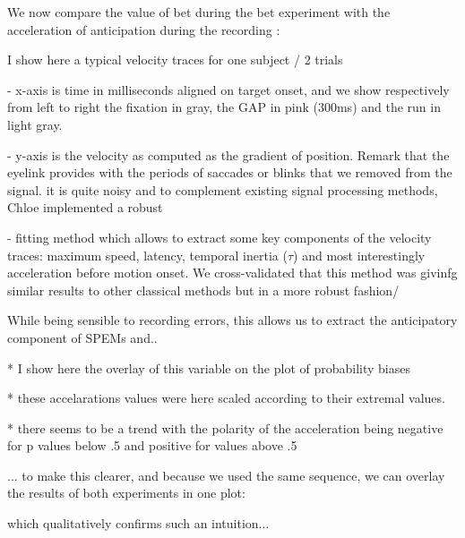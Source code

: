 \documentclass[profile,final,english, draft]{article}%
\begin{document}
We now compare the value of bet during the bet experiment with the acceleration of anticipation during the recording :



I show here a typical velocity traces for one subject / 2 trials

- x-axis is time in milliseconds aligned on target onset, and we show respectively from left to right the fixation in gray, the GAP in pink (300ms) and the run in light gray.

- y-axis is the velocity as computed as the gradient of position. Remark that the eyelink provides with the periods of saccades or blinks that we removed from the signal. it is quite noisy and to complement existing signal processing methods, Chloe implemented a robust

- fitting method which allows to extract some key components of the velocity traces: maximum speed, latency, temporal inertia ($\tau$) and most interestingly acceleration before motion onset. We cross-validated that this method was givinfg similar results to other classical methods but in a more robust fashion/

While being sensible to recording errors, this allows us to extract the anticipatory component of SPEMs and..


 * I show here the overlay of this variable on the plot of probability biases

 * these accelarations values were here scaled according to their extremal values.

 * there seems to be a trend with the polarity of the acceleration being negative for p values below .5 and positive for values above .5

... to make this clearer, and because we used the same sequence, we can overlay the results of both experiments in one plot:

which qualitatively confirms such an intuition...




\end{document}
